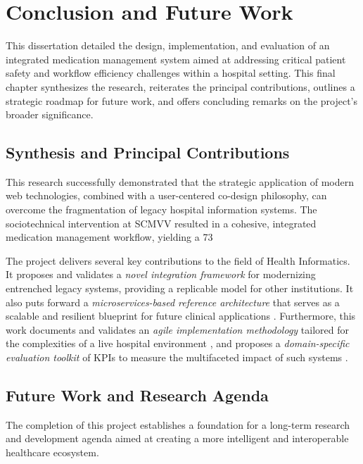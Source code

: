 \chapter{Conclusion and Future Work}

This dissertation detailed the design, implementation, and evaluation of an integrated medication management system aimed at addressing critical patient safety and workflow efficiency challenges within a hospital setting. This final chapter synthesizes the research, reiterates the principal contributions, outlines a strategic roadmap for future work, and offers concluding remarks on the project's broader significance.

\section{Synthesis and Principal Contributions}

This research successfully demonstrated that the strategic application of modern web technologies, combined with a user-centered co-design philosophy, can overcome the fragmentation of legacy hospital information systems. The sociotechnical intervention at SCMVV resulted in a cohesive, integrated medication management workflow, yielding a 73%

The project delivers several key contributions to the field of Health Informatics. It proposes and validates a \textit{novel integration framework} for modernizing entrenched legacy systems, providing a replicable model for other institutions. It also puts forward a \textit{microservices-based reference architecture} that serves as a scalable and resilient blueprint for future clinical applications \cite{newman2021}. Furthermore, this work documents and validates an \textit{agile implementation methodology} tailored for the complexities of a live hospital environment \cite{may2013}, and proposes a \textit{domain-specific evaluation toolkit} of KPIs to measure the multifaceted impact of such systems \cite{donabedian1988}.

\section{Future Work and Research Agenda}

The completion of this project establishes a foundation for a long-term research and development agenda aimed at creating a more intelligent and interoperable healthcare ecosystem.

